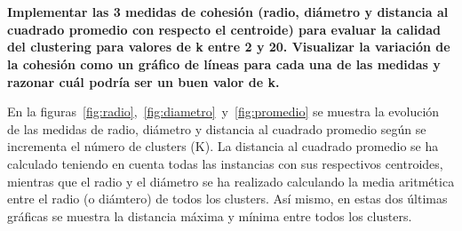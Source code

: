\documentclass[11pt,a4paper]{article}
\begin{document}
 
\pagestyle{fancy}
\fancyhf{}
\rfoot{\thepage\ / \pageref{LastPage}}
\renewcommand{\headrulewidth}{0.4pt}
\renewcommand{\footrulewidth}{0.4pt}
\section*{}

\textbf{Implementar las 3 medidas de cohesión (radio, diámetro y distancia al
cuadrado promedio con respecto el centroide) para evaluar la calidad del
clustering para valores de k entre 2 y 20. Visualizar la variación de la
cohesión como un gráfico de líneas para cada una de las medidas y razonar
cuál podría ser un buen valor de k.}


En la figuras~\ref{fig:radio},~\ref{fig:diametro}~y~\ref{fig:promedio} se
muestra la evolución de las medidas de radio, diámetro y distancia al
cuadrado promedio según se incrementa el número de clusters (K). La distancia
al cuadrado promedio se ha calculado teniendo en cuenta todas las
instancias con sus respectivos centroides, mientras que el radio y el
diámetro se ha realizado calculando la media aritmética entre el radio (o
diámtero) de todos los clusters. Así mismo, en estas dos últimas gráficas
se muestra la distancia máxima y mínima entre todos los clusters. 
\end{document}
